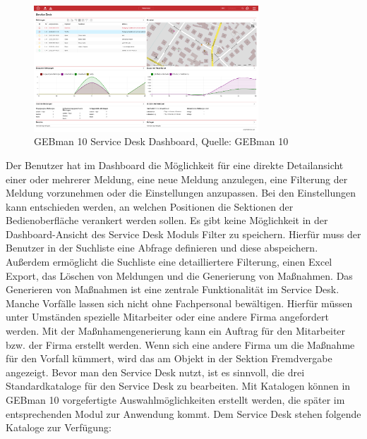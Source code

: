 \begin{figure}[h!]
\centering
	\includegraphics[width=0.75\textwidth]{Abbildungen/GEBman.png}
	\caption[GEBman 10 Service Desk Dashboard]{GEBman 10 Service Desk Dashboard, Quelle: 
	GEBman 10}
	\label{fig:GEBman10 Service Desk Dashboard}
\end{figure}

\noindent
Der Benutzer hat im Dashboard die Möglichkeit für eine direkte Detailansicht einer oder mehrerer Meldung, eine neue Meldung anzulegen, eine Filterung der Meldung vorzunehmen oder die Einstellungen anzupassen. Bei den Einstellungen kann entschieden werden, an welchen Positionen die Sektionen der Bedienoberfläche verankert werden sollen.\newline
Es gibt keine Möglichkeit in der Dashboard-Ansicht des Service Desk Moduls Filter zu speichern. Hierfür muss der Benutzer in der Suchliste eine Abfrage definieren und diese abspeichern. Außerdem ermöglicht die Suchliste eine detailliertere Filterung, einen Excel Export, das Löschen von Meldungen und die Generierung von Maßnahmen. Das Generieren von Maßnahmen ist eine zentrale Funktionalität im Service Desk. Manche Vorfälle lassen sich nicht ohne Fachpersonal bewältigen. Hierfür müssen unter Umständen spezielle Mitarbeiter oder eine andere Firma angefordert werden. Mit der Maßnhamengenerierung kann ein Auftrag für den Mitarbeiter bzw. der Firma erstellt werden. Wenn sich eine andere Firma um die Maßnahme für den Vorfall kümmert, wird das am Objekt in der Sektion Fremdvergabe angezeigt. \newline
Bevor man den Service Desk nutzt, ist es sinnvoll, die drei Standardkataloge für den Service Desk zu bearbeiten. Mit Katalogen können in GEBman 10  vorgefertigte Auswahlmöglichkeiten erstellt werden, die später im entsprechenden Modul zur Anwendung kommt. Dem Service Desk stehen folgende Kataloge zur Verfügung:\\

